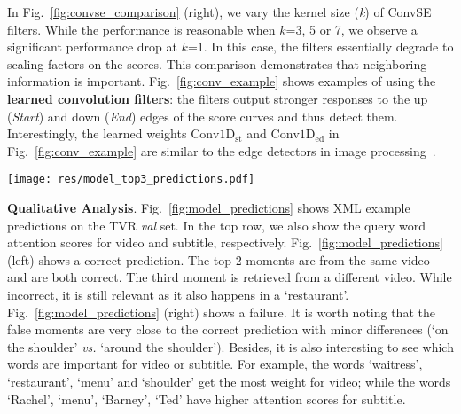 \documentclass[runningheads]{llncs}
\begin{document}
In Fig.~\ref{fig:convse_comparison} (right), we vary the kernel size (\textit{k}) of ConvSE filters. While the performance is reasonable when $k\mbox{=}3$, 5 or 7, we observe a significant performance drop at $k\mbox{=}1$. 
In this case, the filters essentially degrade to scaling factors on the scores.
This comparison demonstrates that neighboring information is important.
Fig.~\ref{fig:conv_example} shows examples of using the \textbf{learned convolution filters}: the filters output stronger responses to the up (\textit{Start}) and down (\textit{End}) edges of the score curves and thus detect them.
Interestingly, the learned weights $\mathrm{Conv1D}_{\mathrm{st}}$ and $\mathrm{Conv1D}_{\mathrm{ed}}$ in Fig.~\ref{fig:conv_example} are similar to the edge detectors in image processing~\cite{szeliski2010computer}.



\begin{figure*}[!t]
  \centering
  \texttt{[image: res/model\_top3\_predictions.pdf]}
  \caption{XML prediction examples for VCMR, on TVR \textit{val} set. We show top-3 retrieved moments for each query. \textit{Top row} shows modular attention scores for query words. \textit{Left column} shows a correct prediction, \textit{right column} shows a failure. Text inside \textit{dashed boxes} is the subtitles associated with the predicted moments. \textit{Orange box} shows the predictions, \textit{green bar} shows the ground truth}
  \label{fig:model_predictions}
\end{figure*}



\kern1mm
\noindent\textbf{Qualitative Analysis}.
Fig.~\ref{fig:model_predictions} shows XML example predictions on the TVR \textit{val} set. 
In the top row, we also show the query word attention scores for video and subtitle, respectively. Fig.~\ref{fig:model_predictions} (left) shows a correct prediction. The top-2 moments are from the same video and are both correct. The third moment is retrieved from a different video. While incorrect, it is still relevant as it also happens in a `restaurant'. Fig.~\ref{fig:model_predictions} (right) shows a failure. It is worth noting that the false moments are very close to the correct prediction with minor differences (`on the shoulder' \textit{vs.} `around the shoulder'). Besides, it is also interesting to see which words are important for video or subtitle. For example, the words `waitress', `restaurant', `menu' and `shoulder' get the most weight for video; while the words `Rachel', `menu', `Barney', `Ted' have higher attention scores for subtitle.
\end{document}
